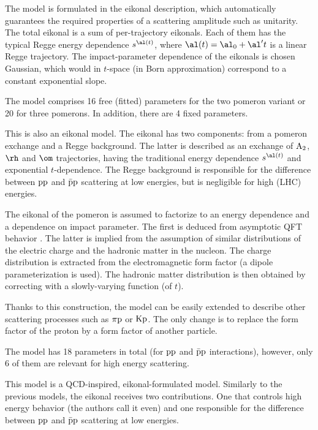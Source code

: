 The model is formulated in the eikonal description, which automatically guarantees the required properties of a scattering amplitude such as unitarity. The total eikonal is a sum of per-trajectory eikonals. Each of them has the typical Regge energy dependence $s^{\al(t)}$, where $\al(t) = \al_0 + \al' t$ is a linear Regge trajectory. The impact-parameter dependence of the eikonals is chosen Gaussian, which would in $t$-space (in Born approximation) correspond to a constant exponential slope.

The model comprises 16 free (fitted) parameters for the two pomeron variant or 20 for three pomerons. In addition, there are 4 fixed parameters.

\def\OutlineLabel{The model of Bourrely et al.}

This is also an eikonal model. The eikonal has two components: from a pomeron exchange and a Regge background. The latter is described as an exchange of $\rm A_2$, $\rm \rh$ and $\rm \om$ trajectories, having the traditional energy dependence $s^{\al(t)}$ and exponential $t$-dependence. The Regge background is responsible for the difference between $\rm pp$ and $\rm\bar pp$ scattering at low energies, but is negligible for high (LHC) energies.

The eikonal of the pomeron is assumed to factorize to an energy dependence and a dependence on impact parameter. The first is deduced from asymptotic QFT behavior . The latter is implied from the assumption of similar distributions of the electric charge and the hadronic matter in the nucleon. The charge distribution is extracted from the electromagnetic form factor (a dipole parameterization is used). The hadronic matter distribution is then obtained by correcting with a slowly-varying function (of $t$).

Thanks to this construction, the model can be easily extended to describe other scattering processes such as $\rm \pi p$ or $\rm Kp$. The only change is to replace the form factor of the proton by a form factor of another particle.

The model has 18 parameters in total (for $\rm pp$ and $\rm \bar p p$ interactions), however, only 6 of them are relevant for high energy scattering.

\def\OutlineLabel{The model of Block et al.}

This model is a QCD-inspired, eikonal-formulated model. Similarly to the previous models, the eikonal receives two contributions. One that controls high energy behavior (the authors call it even) and one responsible for the difference between $\rm pp$ and $\rm\bar pp$ scattering at low energies.

